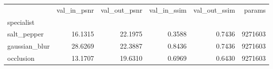 \begin{tabular}{lrrrrr}
\toprule
 & val_in_psnr & val_out_psnr & val_in_ssim & val_out_ssim & params \\
specialist &  &  &  &  &  \\
\midrule
salt_pepper & 16.1315 & 22.1975 & 0.3588 & 0.7436 & 9271603 \\
gaussian_blur & 28.6269 & 22.3887 & 0.8436 & 0.7436 & 9271603 \\
occlusion & 13.1707 & 19.6310 & 0.6969 & 0.6430 & 9271603 \\
\bottomrule
\end{tabular}
